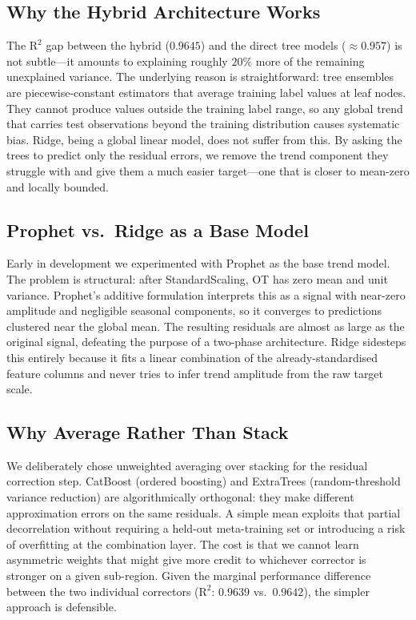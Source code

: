 \documentclass[conference]{IEEEtran}
\begin{document}
  \subsection{Why the Hybrid Architecture Works}

  The $\text{R}^{2}$ gap between the hybrid ($0.9645$) and the direct tree models
  ($\approx 0.957$) is not subtle---it amounts to explaining roughly $20\%$ more
  of the remaining unexplained variance. The underlying reason is straightforward:
  tree ensembles are piecewise-constant estimators that average training label values
  at leaf nodes. They cannot produce values outside the training label range, so any
  global trend that carries test observations beyond the training distribution causes
  systematic bias. Ridge, being a global linear model, does not suffer from this. By
  asking the trees to predict only the residual errors, we remove the trend component
  they struggle with and give them a much easier target---one that is closer to
  mean-zero and locally bounded.

  \subsection{Prophet vs.\ Ridge as a Base Model}

  Early in development we experimented with Prophet as the base trend model. The
  problem is structural: after StandardScaling, OT has zero mean and unit variance.
  Prophet's additive formulation interprets this as a signal with near-zero amplitude
  and negligible seasonal components, so it converges to predictions clustered near
  the global mean. The resulting residuals are almost as large as the original signal,
  defeating the purpose of a two-phase architecture. Ridge sidesteps this entirely
  because it fits a linear combination of the already-standardised feature columns and
  never tries to infer trend amplitude from the raw target scale.

  \subsection{Why Average Rather Than Stack}

  We deliberately chose unweighted averaging over stacking for the residual correction
  step. CatBoost (ordered boosting) and ExtraTrees (random-threshold variance reduction)
  are algorithmically orthogonal: they make different approximation errors on the same
  residuals. A simple mean exploits that partial decorrelation without requiring a
  held-out meta-training set or introducing a risk of overfitting at the combination
  layer. The cost is that we cannot learn asymmetric weights that might give more
  credit to whichever corrector is stronger on a given sub-region. Given the marginal
  performance difference between the two individual correctors ($\text{R}^{2}$: $0.9639$
  vs.\ $0.9642$), the simpler approach is defensible.
\end{document}
